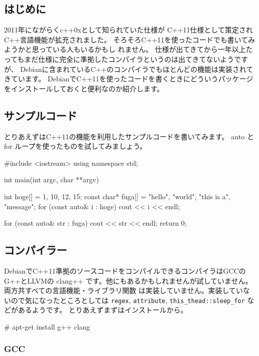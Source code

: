 \documentclass[mingoth,a4paper]{jsarticle}
\begin{document}
\subsection{はじめに}

2011年にながらくc++0xとして知られていた仕様が
C++11仕様\cite{n3242}として策定されC++言語機能が拡充されました。
そろそろC++11を使ったコードでも書いてみようかと思っている人もいるかもし
れません。
仕様が出てきてから一年以上たってもまだ仕様に完全に準拠したコンパイラというのは出てきてないようですが、
Debianに含まれているC++のコンパイラでもほとんどの機能は実装されてきています。
DebianでC++11を使ったコードを書くときにどういうパッケージをインストールしておくと便利なのか紹介します。

\subsection{サンプルコード}

とりあえずはC++11の機能を利用したサンプルコードを書いてみます。
auto と for ループを使ったものを試してみましょう。

\begin{commandline}
#include <iostream>
using namespace std;

int main(int argc, char **argv) {
  int hoge[] = { 1, 10, 12, 15};
  const char* fuga[] = { "hello", "world", "this is a", "message"};
  for (const auto& i : hoge) {
    cout << i << endl;
  }

  for (const auto& str : fuga) {
    cout << str << endl;
  }
  return 0;
}
\end{commandline}

\subsection{コンパイラー}

DebianでC++11準拠のソースコードをコンパイルできるコンパイラはGCCのG++とLLVMの
clang++ です。他にもあるかもしれませんが試していません。両方共すべての言語機能・ライブラリ関数
は実装していません\cite{gcc11support,clang11support}。実装していないので気になったところとしては \texttt{regex}, \texttt{attribute},
\verb!this_thead::sleep_for! などがあるようです。
とりあえずまずはインストールから。

\begin{commandline}
# apt-get install g++ clang
\end{commandline}

\subsubsection{GCC}
\end{document}
